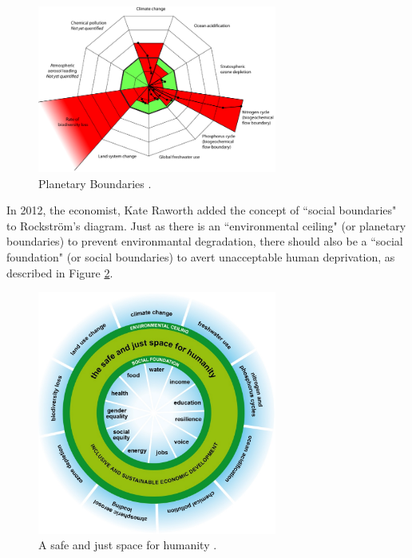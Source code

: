 \documentclass[11pt,a4paper]{article}
\begin{document}
\begin{figure}[!htbp]
\centering
\includegraphics[width=0.70\textwidth]{img/Johan_planetaryBoundaries.png}
\caption{Planetary Boundaries \parencite{Rockstrom2009}.\label{Johan_planetaryBoundaries}}
\end{figure}

In 2012, the economist, Kate Raworth added the concept of ``social boundaries" to Rockström's diagram. Just as there is an ``environmental ceiling" (or planetary boundaries) to prevent environmantal degradation, there should also be a ``social foundation" (or social boundaries) to avert unacceptable human deprivation, as described in Figure \ref{Kate_donut}. \parencite{Raworth2012}

\begin{figure}[!htbp]
\centering
\includegraphics[width=0.70\textwidth]{img/Kate_donut.png}
\caption{A safe and just space for humanity \parencite{Raworth2012}.\label{Kate_donut}}
\end{figure}
\end{document}
